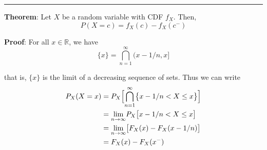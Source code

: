 \documentclass{report}
\begin{document}
\hrule
\vspace{5mm}

\noindent \textbf{Theorem}: Let $X$ be a random variable with CDF $f_X$. Then, $$P(X = c) = f_X(c) - f_X(c^-)$$

\noindent \textbf{Proof}: For all $x \in \mathbb{R}$, we have
$$\{x\} = \overset{\infty}{\underset{n=1}{\bigcap}} \bigl(
  x - 1/n, x \bigl]$$

\noindent that is, $\{x\}$ is the limit of a decreasing sequence of sets. Thus we can write
\begin{align*}
  P_X(X = x) & = P_X \Bigl[ \overset{\infty}{\underset{n=1}{\bigcap}} \bigl\{ x - 1/n < X \leq x \bigr\} \Bigr] \\
             & = \underset{n \rightarrow \infty}{\text{lim}} P_X\bigl[x - 1/n < X \leq x \bigr]                 \\
             & = \underset{n \rightarrow \infty}{\text{lim}} \bigl[F_X(x) - F_X(x - 1/n) \bigr]                 \\
             & = F_X(x) - F_X(x^-)
\end{align*}
\end{document}
